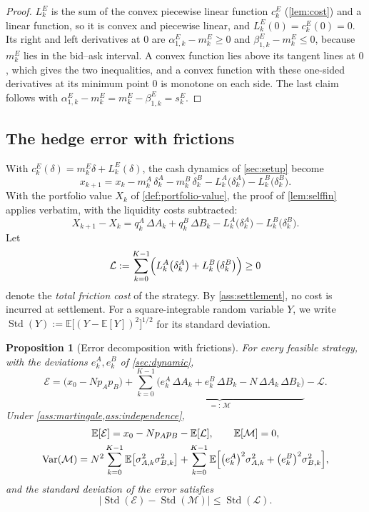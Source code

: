 \documentclass[11pt,a4paper]{article}
\theoremstyle{plain}
\newtheorem{proposition}[theorem]{Proposition}
\theoremstyle{definition}
\theoremstyle{remark}
\newcommand{\E}{\mathbb{E}}
\newcommand{\1}{\mathbf{1}}
\newcommand{\Var}{\operatorname{Var}}
\begin{document}
\begin{proof}
$L^E_k$ is the sum of the convex piecewise linear function $c^E_k$ (\cref{lem:cost}) and a linear function, so it is convex and piecewise linear, and $L^E_k(0)=c^E_k(0)=0$. Its right and left derivatives at $0$ are $\alpha^E_{1,k}-m^E_k\geq 0$ and $\beta^E_{1,k}-m^E_k\leq 0$, because $m^E_k$ lies in the bid--ask interval. A convex function lies above its tangent lines at $0$, which gives the two inequalities, and a convex function with these one-sided derivatives at its minimum point $0$ is monotone on each side. The last claim follows with $\alpha^E_{1,k}-m^E_k = m^E_k-\beta^E_{1,k} = s^E_k$.
\end{proof}

\subsection{The hedge error with frictions}

With $c^E_k(\delta) = m^E_k\delta + L^E_k(\delta)$, the cash dynamics of \cref{sec:setup} become
\[
x_{k+1} = x_k - m^A_k\,\delta^A_k - m^B_k\,\delta^B_k - L^A_k\bigl(\delta^A_k\bigr) - L^B_k\bigl(\delta^B_k\bigr).
\]
With the portfolio value $X_k$ of \cref{def:portfolio-value}, the proof of \cref{lem:selffin} applies verbatim, with the liquidity costs subtracted:
\[
X_{k+1}-X_k = q^A_k\,\Delta A_k + q^B_k\,\Delta B_k - L^A_k\bigl(\delta^A_k\bigr) - L^B_k\bigl(\delta^B_k\bigr).
\]
Let
\[
\mathcal{L} := \sum_{k=0}^{K-1}\Bigl(L^A_k\bigl(\delta^A_k\bigr) + L^B_k\bigl(\delta^B_k\bigr)\Bigr)\geq 0
\]
denote the \emph{total friction cost} of the strategy. By \cref{ass:settlement}, no cost is incurred at settlement. For a square-integrable random variable $Y$, we write $\operatorname{Std}(Y) := \E\bigl[(Y-\E[Y])^2\bigr]^{1/2}$ for its standard deviation.

\begin{proposition}[Error decomposition with frictions]
\label{prop:decomposition-frictions}
For every feasible strategy, with the deviations $e^A_k,e^B_k$ of \cref{sec:dynamic},
\begin{equation}
\label{eq:decomposition-frictions}
\mathcal{E} = \bigl(x_0 - Np_Ap_B\bigr) + \underbrace{\sum_{k=0}^{K-1}\bigl(e^A_k\,\Delta A_k + e^B_k\,\Delta B_k - N\,\Delta A_k\,\Delta B_k\bigr)}_{=:\,\mathcal{M}} - \mathcal{L}.
\end{equation}
Under \cref{ass:martingale,ass:independence},
\begin{gather*}
\E[\mathcal{E}] = x_0 - Np_Ap_B - \E[\mathcal{L}],\qquad \E[\mathcal{M}]=0,\\
\Var(\mathcal{M}) = N^2\sum_{k=0}^{K-1}\E\bigl[\sigma^2_{A,k}\sigma^2_{B,k}\bigr] + \sum_{k=0}^{K-1}\E\Bigl[\bigl(e^A_k\bigr)^2\sigma^2_{A,k} + \bigl(e^B_k\bigr)^2\sigma^2_{B,k}\Bigr],
\end{gather*}
and the standard deviation of the error satisfies
\begin{equation}
\label{eq:std-bound}
\bigl|\operatorname{Std}(\mathcal{E}) - \operatorname{Std}(\mathcal{M})\bigr|\leq\operatorname{Std}(\mathcal{L}).
\end{equation}
\end{proposition}
\end{document}
